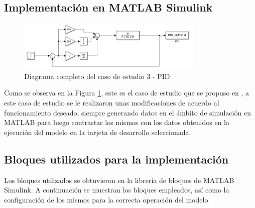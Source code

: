 \subsection{Implementación en MATLAB Simulink}

\begin{figure}[h!]
    \centering
    \includegraphics[width=0.8\textwidth]{fig/Capitulo5/Caso_de_estudio_PID/PID_Diagram.pdf}
    \caption{Diagrama completo del caso de estudio 3 - PID }
    \label{fig:caso_de_estudio_3_PID}
\end{figure}


Como se observa en la Figura \ref{fig:caso_de_estudio_3_PID}, este es el caso de estudio que se propuso en \cite{microcontrollerslab_pid_controller_design}, a este caso de estudio se le realizaron unas modificaciones de acuerdo al funcionamiento deseado, siempre generando datos en el ámbito de simulación en MATLAB para luego contrastar los mismos con los datos obtenidos en la ejecución del modelo en la tarjeta de desarrollo seleccionada.

\subsection{Bloques utilizados para la implementación}

Los bloques utilizados se obtuvieron en la librería de bloques de MATLAB Simulink. A continuación se muestran los bloques empleados, así como la configuración de los mismos para la correcta operación del modelo.

